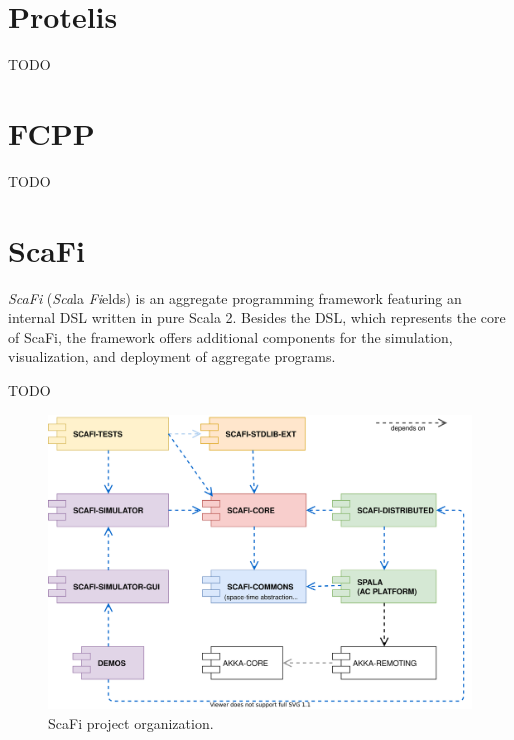 \section{Protelis}
TODO

\section{FCPP}
TODO

\section{ScaFi}

\textit{ScaFi} (\textit{Sca}la \textit{Fi}elds) is an aggregate programming framework featuring an internal \ac{DSL} written in pure Scala 2.
%
Besides the \ac{DSL}, which represents the core of ScaFi, the framework offers additional components for the simulation, visualization, and deployment of aggregate programs.

TODO

\begin{figure}
    \centering
    \includegraphics[width=.8\linewidth]{figures/scafi-project-org.drawio.png}
    \caption{ScaFi project organization.}
    \label{fig:random-image2}
\end{figure}

